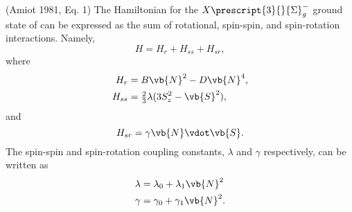 \documentclass[11pt, twoside, fleqn]{report}
\newcommand{\state}[2]{\prescript{#1}{}{#2}}
\begin{document}
    (Amiot 1981, Eq. 1)
    The Hamiltonian for the $X\state{3}{\Sigma}_g^{-}$ ground state of  can be expressed as the sum of rotational, spin-spin, and spin-rotation interactions. Namely,
    \begin{equation*}
        H = H_r + H_{ss} + H_{sr},
    \end{equation*}
    where
    \begin{align*}
        H_r  & = B\vb{N}^2 - D\vb{N}^4,                    \\
        H_{ss} & = \tfrac{2}{3}\lambda(3S_z^2 - \vb{S}^2),
    \end{align*}
    and
    \begin{equation*}
        H_{sr} = \gamma\vb{N}\vdot\vb{S}.
    \end{equation*}
    The spin-spin and spin-rotation coupling constants, $\lambda$ and $\gamma$ respectively, can be written as
    \begin{align*}
        \lambda & = \lambda_0 + \lambda_1\vb{N}^2 \\
        \gamma  & = \gamma_0 + \gamma_1\vb{N}^2.
    \end{align*}
\end{document}
